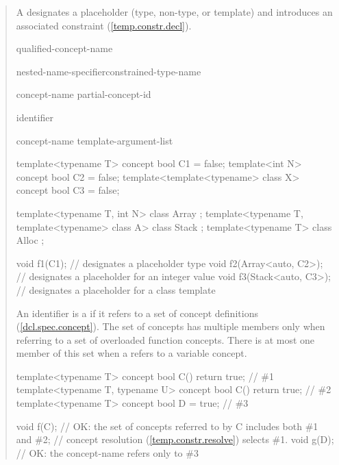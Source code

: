 \begin{quote}
\begin{addedblock}
\pnum
A  designates a placeholder
(type, non-type, or template) and introduces an associated constraint
(\ref{temp.constr.decl}).

\begin{bnf}
\br
	qualified-concept-name

\br
	nested-name-specifier\opt constrained-type-name

\br
  concept-name\br
  partial-concept-id

\br
  identifier

\br
		concept-name \terminal{<} template-argument-list\opt \terminal{>}
\end{bnf}

\enterexample
\begin{codeblock}
template<typename T> concept bool C1 = false;
template<int N> concept bool C2 = false;
template<template<typename> class X> concept bool C3 = false;

template<typename T, int N> class Array { };
template<typename T, template<typename> class A> class Stack { };
template<typename T> class Alloc { };

void f1(C1);              //  designates a placeholder type
void f2(Array<auto, C2>); //  designates a placeholder for an integer value
void f3(Stack<auto, C3>); //  designates a placeholder for a class template
\end{codeblock}
\exitexample

\pnum
An identifier is a  if it refers to a set of 
concept definitions (\ref{dcl.spec.concept}).
%
\enternote
The set of concepts has multiple members only when referring to a set of 
overloaded function concepts. There is at most one member of this set when a
 refers to a variable concept.
\exitnote
%
\enterexample
\begin{codeblock}
template<typename T> concept bool C() { return true; }             // \#1
template<typename T, typename U> concept bool C() { return true; } // \#2
template<typename T> concept bool D = true;                        // \#3

void f(C); // OK: the set of concepts referred to by C includes both \#1 and \#2;
           // concept resolution (\ref{temp.constr.resolve}) selects \#1.
void g(D); // OK: the concept-name  refers only to \#3
\end{codeblock}
\exitexample


\end{addedblock}
\end{quote}
